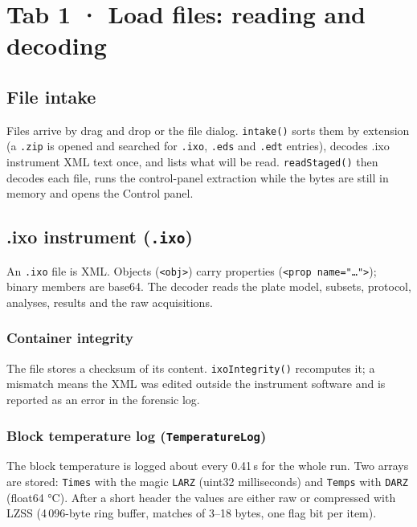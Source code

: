 \chapter{Tab 1 · Load files: reading and decoding}\label{ch:load}


\section{File intake}
Files arrive by drag and drop or the file dialog. \texttt{intake()} sorts them by extension (a \texttt{.zip} is opened and searched
for \texttt{.ixo}, \texttt{.eds} and \texttt{.edt} entries), decodes .ixo instrument XML text once, and lists what will be read.
\texttt{readStaged()} then decodes each file, runs the control-panel extraction while the bytes are still in memory and
opens the Control panel.





\section{.ixo instrument (\texttt{.ixo})}
An \texttt{.ixo} file is XML. Objects (\texttt{<obj>}) carry properties (\texttt{<prop name="\dots">}); binary members are base64.
The decoder reads the plate model, subsets, protocol, analyses, results and the raw acquisitions.



\subsection*{Container integrity}
The file stores a checksum of its content. \texttt{ixoIntegrity()} recomputes it; a mismatch means the XML was edited
outside the instrument software and is reported as an error in the forensic log.



\subsection*{Block temperature log (\texttt{TemperatureLog})}
The block temperature is logged about every 0.41\,s for the whole run. Two arrays are stored: \texttt{Times} with the magic
\texttt{LARZ} (uint32 milliseconds) and \texttt{Temps} with \texttt{DARZ} (float64 °C). After a short header the values are
either raw or compressed with LZSS (4\,096-byte ring buffer, matches of 3--18 bytes, one flag bit per item).

